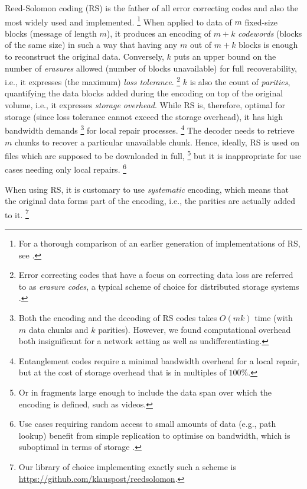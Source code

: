 \documentclass[a4paper,11pt]{article}
\begin{document}
Reed-Solomon coding (RS)  \citep{reed1960polynomial,lubyetal1995CRS,plank2006optimizing,li2013erasure}
is the father of all  error correcting codes and also the most widely used and implemented.%
%
\footnote{%
For a thorough comparison of an earlier generation of implementations of RS, see \citet{plank2009performance}.}
%
When applied to data of $m$ fixed-size blocks (message of length $m$), it produces an encoding of $m+k$ \emph{codewords} (blocks of the same size)
in such a way that having any $m$ out of $m+k$ blocks is enough to reconstruct the original data. Conversely, $k$ puts an upper bound on the number of \emph{erasures} allowed (number of blocks unavailable) for full recoverability, i.e., it expresses (the maximum) \emph{loss tolerance}.%
%
\footnote{Error correcting codes that have a focus on correcting data loss are referred to as \emph{erasure codes}, a typical scheme of choice for distributed storage systems \citep{balaji2018erasure}.}
%
$k$ is also the count of \emph{parities}, quantifying the data blocks added during the encoding on top of the original volume, i.e., it expresses \emph{storage overhead}. While RS is, therefore, optimal for storage (since loss tolerance cannot exceed the storage overhead),
it has high bandwidth demands%
%
\footnote{Both the encoding and the decoding of RS codes takes $O(mk)$ time (with $m$ data chunks and $k$ parities). However, we found computational overhead both insignificant for a network setting as well as undifferentiating.}
%
for local repair processes.%
%
\footnote{Entanglement codes \citep{estrada2018alpha, estrada2019building} require a minimal bandwidth overhead for a local repair, but at the cost of storage overhead that is in multiples of $100\%$.}
%
The decoder needs to retrieve $m$ chunks to recover a particular unavailable chunk.
Hence, ideally, RS is used on files which are supposed to be downloaded in full,%
%
\footnote{Or in  fragments large enough  to include the data span over which the encoding is defined, such as videos.}
%
 but it is inappropriate for use cases needing only local repairs.%
%
\footnote{Use cases requiring random access to small amounts of data (e.g., path lookup) benefit from simple replication to optimise on bandwidth, which is suboptimal in terms of storage \citep{weatherspoon2002erasure}.}

When using RS, it is customary to use \emph{systematic} encoding, which means that the original data forms part of the encoding, i.e., the parities are actually added to it.%
%
%
\footnote{Our library of choice implementing exactly such a scheme is \url{https://github.com/klauspost/reedsolomon}.}
%
%
%
\newpage
\end{document}
